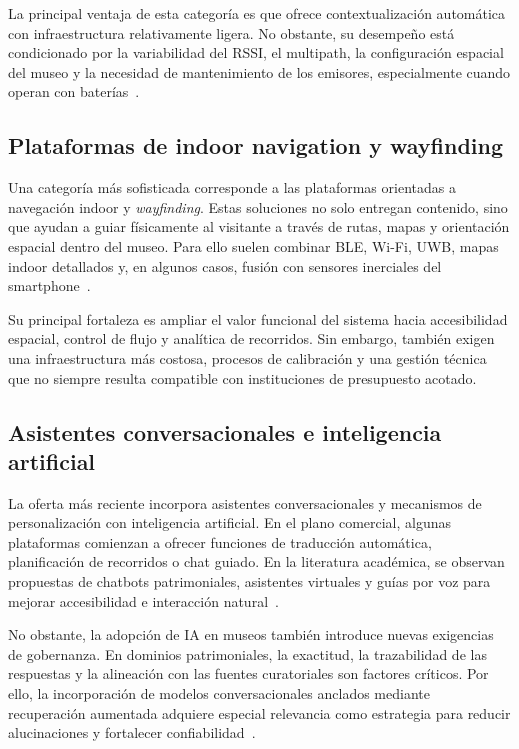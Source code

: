 La principal ventaja de esta categoría es que ofrece contextualización automática con infraestructura relativamente ligera. No obstante, su desempeño está condicionado por la variabilidad del RSSI, el multipath, la configuración espacial del museo y la necesidad de mantenimiento de los emisores, especialmente cuando operan con baterías~\cite{verde2023blemuseum,leitch2023indoor}.

\subsection{Plataformas de indoor navigation y wayfinding}

Una categoría más sofisticada corresponde a las plataformas orientadas a navegación indoor y \textit{wayfinding}. Estas soluciones no solo entregan contenido, sino que ayudan a guiar físicamente al visitante a través de rutas, mapas y orientación espacial dentro del museo. Para ello suelen combinar BLE, Wi-Fi, UWB, mapas indoor detallados y, en algunos casos, fusión con sensores inerciales del smartphone~\cite{naviginemuseums,leitch2023indoor,qiao2024uwb}.

Su principal fortaleza es ampliar el valor funcional del sistema hacia accesibilidad espacial, control de flujo y analítica de recorridos. Sin embargo, también exigen una infraestructura más costosa, procesos de calibración y una gestión técnica que no siempre resulta compatible con instituciones de presupuesto acotado.

\subsection{Asistentes conversacionales e inteligencia artificial}

La oferta más reciente incorpora asistentes conversacionales y mecanismos de personalización con inteligencia artificial. En el plano comercial, algunas plataformas comienzan a ofrecer funciones de traducción automática, planificación de recorridos o chat guiado. En la literatura académica, se observan propuestas de chatbots patrimoniales, asistentes virtuales y guías por voz para mejorar accesibilidad e interacción natural~\cite{smartguidepricing,smartifypricing,bouras2023chatbots,machidon2020culturalerica,duguleana2020virtualassistant,wang2024voiceguide}.

No obstante, la adopción de IA en museos también introduce nuevas exigencias de gobernanza. En dominios patrimoniales, la exactitud, la trazabilidad de las respuestas y la alineación con las fuentes curatoriales son factores críticos. Por ello, la incorporación de modelos conversacionales anclados mediante recuperación aumentada adquiere especial relevancia como estrategia para reducir alucinaciones y fortalecer confiabilidad~\cite{lewis2020rag,bechard2024hallucination,unescoaiculture2025}.

